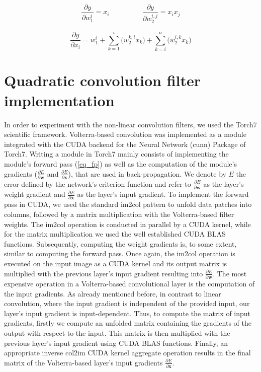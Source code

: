 \documentclass[10pt,twocolumn,letterpaper]{article}
\renewcommand{\vec}[1]{\mathbf{#1}}
\begin{document}
\begin{equation}
\label{eq_bp_w}
  \frac{\partial y}{\partial w_1^i} = x_i \qquad\text{ }\qquad \frac{\partial y}{\partial w_2^{i,j}} = x_ix_j
\end{equation}

\begin{equation}
\label{eq_bp_x}
  \frac{\partial y}{\partial x_i} = w_1^i + \sum_{k=1}^{i}{\big( w_2^{k,i} x_k \big)} + \sum_{k=i}^{n}{\big( w_2^{i,k} x_k \big)}
\end{equation}





\section{Quadratic convolution filter implementation}
\label{CodeImpl}

     In order to experiment with the non-linear convolution filters, we used the Torch7 scientific framework. Volterra-based convolution was implemented as a module integrated with the CUDA backend for the Neural Network (cunn) Package of Torch7. Writing a module in Torch7 mainly consists of implementing the module's forward pass (\ref{eq_fp}) as well as the computation of the module's gradients ($\frac{\partial E}{\partial {\vec{w}}}$ and $\frac{\partial E}{\partial {\vec{x}}}$), that are used in back-propagation. We denote by $E$ the error defined by the network's criterion function and refer to $\frac{\partial E}{\partial {\vec{w}}}$ as the layer's weight gradient and $\frac{\partial E}{\partial {\vec{x}}}$ as the layer's input gradient. To implement the forward pass in CUDA, we used the standard im2col \cite{Chellapilla} pattern to unfold data patches into columns, followed by a matrix multiplication with the Volterra-based filter weights. The im2col operation is conducted in parallel by a CUDA kernel, while for the matrix multiplication we used the well established CUDA BLAS functions. Subsequently, computing the weight gradients is, to some extent, similar to computing the forward pass. Once again, the im2col operation is executed on the input image as a CUDA kernel and its output matrix is multiplied with the previous layer's input gradient resulting into $\frac{\partial E}{\partial {\vec{w}}}$. The most expensive operation in a Volterra-based convolutional layer is the computation of the input gradients. As already mentioned before, in contrast to linear convolution, where the input gradient is independent of the provided input, our layer's  input gradient is input-dependent. Thus, to compute the matrix of input gradients, firstly we compute an unfolded matrix containing the gradients of the output with respect to the input. This matrix is then multiplied with the previous layer's input gradient using CUDA BLAS functions. Finally, an appropriate inverse col2im CUDA kernel aggregate operation results in the final matrix of the Volterra-based layer's input gradients $\frac{\partial E}{\partial \vec{x}}$.
\end{document}
